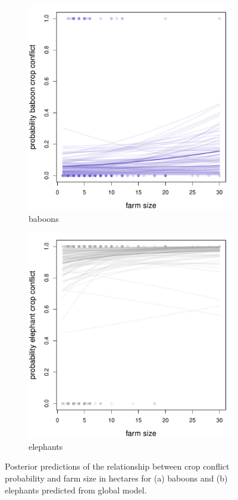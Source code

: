 \documentclass[12pt,]{article}
\begin{document}
\begin{figure}[H]
  \centering
	\begin{subfigure}[b]{0.49\textwidth}
	\includegraphics[width=\textwidth]{Figures/farmsize_crop_global_conflict_bab.pdf} 
    \caption{baboons}
   	    \label{fig:cropFSbab}
\end{subfigure}
\begin{subfigure}[b]{0.49\textwidth}
	\includegraphics[width=\textwidth]{Figures/farmsize_crop_global_conflict_ele.pdf}  
    \caption{elephants}
  	\label{fig:cropFSele}
\end{subfigure}
\caption{Posterior predictions of the relationship between crop conflict probability and farm size in hectares for (a) baboons and (b) elephants predicted from global model.}
\end{figure}
\end{document}
